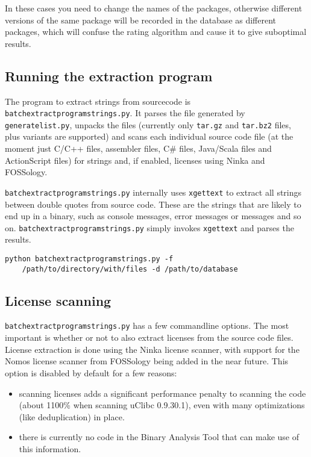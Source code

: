 \documentclass[10pt]{article}
\begin{document}
In these cases you need to change the names of the packages, otherwise
different versions of the same package will be recorded in the database as
different packages, which will confuse the rating algorithm and cause it to
give suboptimal results.


\subsection{Running the extraction program}

The program to extract strings from sourcecode is
\texttt{batchextractprogramstrings.py}. It parses the file generated by
\texttt{generatelist.py}, unpacks the files (currently only \texttt{tar.gz}
and \texttt{tar.bz2} files, plus variants are supported) and scans each
individual source code file (at the moment just C/C++ files, assembler files,
C\# files, Java/Scala files and ActionScript files) for strings and, if
enabled, licenses using Ninka and FOSSology.

\texttt{batchextractprogramstrings.py} internally uses \texttt{xgettext} to
extract all strings between double quotes from source code. These are the
strings that are likely to end up in a binary, such as console messages, error
messages or messages and so on. \texttt{batchextractprogramstrings.py} simply
invokes \texttt{xgettext} and parses the results.

\begin{verbatim}
python batchextractprogramstrings.py -f
    /path/to/directory/with/files -d /path/to/database
\end{verbatim}

\subsection{License scanning}

\texttt{batchextractprogramstrings.py} has a few commandline options. The most
important is whether or not to also extract licenses from the source code files.
License extraction is done using the Ninka license scanner, with support
for the Nomos license scanner from FOSSology being added in the near future.
This option is disabled by default for a few reasons:

\begin{itemize}
\item scanning licenses adds a significant performance penalty to scanning the
code (about 1100\% when scanning uClibc 0.9.30.1), even with many
optimizations (like deduplication) in place.
\item there is currently no code in the Binary Analysis Tool that can make use
of this information.
\end{itemize}
\end{document}
